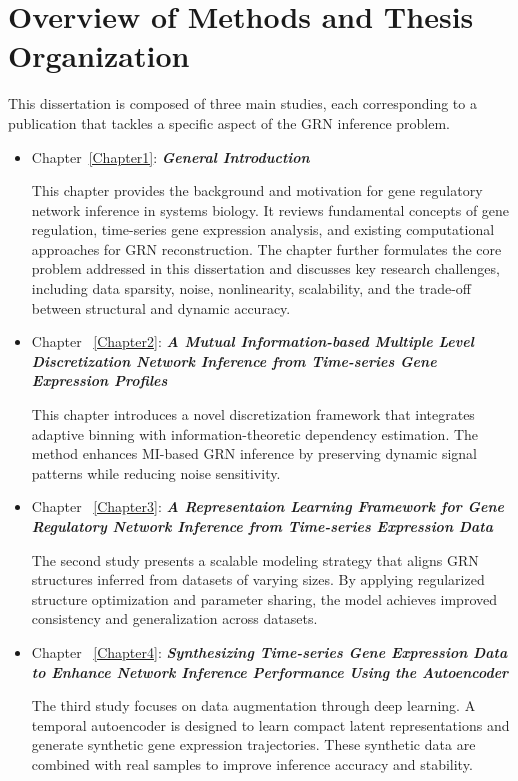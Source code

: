 \section{Overview of Methods and Thesis Organization}
This dissertation is composed of three main studies, each corresponding to a publication that tackles a specific aspect of the GRN inference problem.
\begin{itemize}
\item Chapter~\ref{Chapter1}: \textbf{\textit{General Introduction}}

This chapter provides the background and motivation for gene regulatory network inference in systems biology. It reviews fundamental concepts of gene regulation, time-series gene expression analysis, and existing computational approaches for GRN reconstruction. The chapter further formulates the core problem addressed in this dissertation and discusses key research challenges, including data sparsity, noise, nonlinearity, scalability, and the trade-off between structural and dynamic accuracy.
\item Chapter ~\ref{Chapter2}: \textbf{\textit{A Mutual Information-based Multiple Level Discretization Network Inference from Time-series Gene Expression Profiles}}

This chapter introduces a novel discretization framework that integrates adaptive binning with information-theoretic dependency estimation. The method enhances MI-based GRN inference by preserving dynamic signal patterns while reducing noise sensitivity.
\item Chapter ~\ref{Chapter3}: \textbf{\textit{A Representaion Learning Framework for Gene Regulatory Network Inference from Time-series Expression Data}}

The second study presents a scalable modeling strategy that aligns GRN structures inferred from datasets of varying sizes. By applying regularized structure optimization and parameter sharing, the model achieves improved consistency and generalization across datasets.

\item Chapter ~\ref{Chapter4}: \textbf{\textit{Synthesizing Time-series Gene Expression Data to Enhance Network Inference Performance Using the Autoencoder}}

The third study focuses on data augmentation through deep learning. A temporal autoencoder is designed to learn compact latent representations and generate synthetic gene expression trajectories. These synthetic data are combined with real samples to improve inference accuracy and stability.
\end{itemize}

